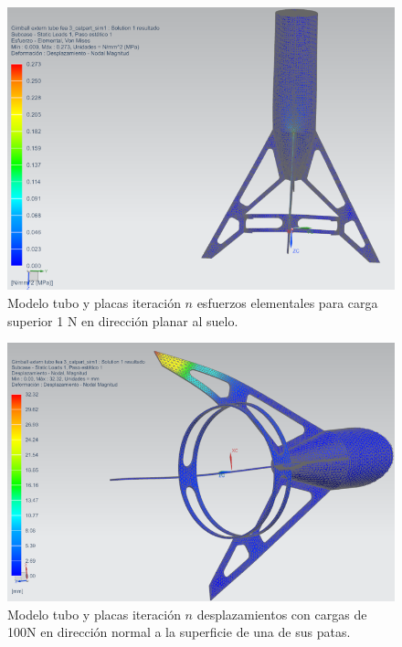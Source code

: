 \begin{figure}[htb]
    \centering
    \includegraphics[height=0.25\pdfpageheight]{fig/fea/patas2.png}
    \caption{Modelo tubo y placas iteración $n$ esfuerzos elementales para carga superior 1 N en dirección planar al suelo.}
    \label{fig:fea/patas2}
\end{figure}

\begin{figure}[htb]
    \centering
    \includegraphics[height=0.3\pdfpageheight]{fig/fea/patas3.png}
    \caption{Modelo tubo y placas iteración $n$ desplazamientos con cargas de 100N en dirección normal a la superficie de una de sus patas.}
    \label{fig:fea/patas3}
\end{figure}


